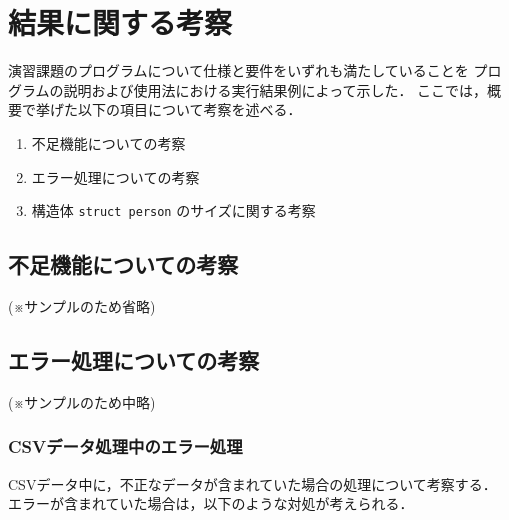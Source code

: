 \documentclass[a4j,11pt]{jarticle}
\begin{document}
\section{結果に関する考察}


演習課題のプログラムについて仕様と要件をいずれも満たしていることを
プログラムの説明および使用法における実行結果例によって示した．
ここでは，概要で挙げた以下の項目について考察を述べる．

\begin{enumerate}
\setlength{\parskip}{2pt} \setlength{\itemsep}{2pt}
    \item 不足機能についての考察
    \item エラー処理についての考察
    \item 構造体 \verb|struct person| のサイズに関する考察
\end{enumerate}

\subsection{不足機能についての考察}

(※サンプルのため省略)

\subsection{エラー処理についての考察}

(※サンプルのため中略)

\subsubsection{CSVデータ処理中のエラー処理}

CSVデータ中に，不正なデータが含まれていた場合の処理について考察する．
エラーが含まれていた場合は，以下のような対処が考えられる．
\end{document}
